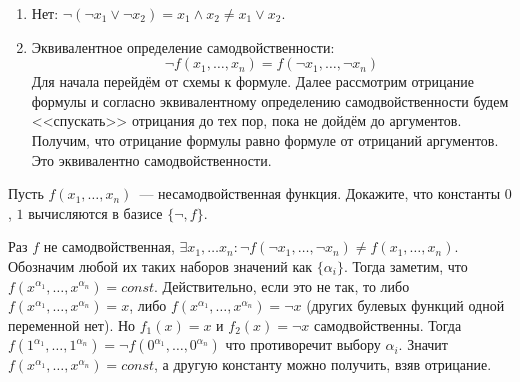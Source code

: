 \begin{Answer}
    \noindent
    \begin{enumerate}[label=\textbf{\alph*)}]
        \item
            Нет: $ \neg(\neg x_1 \vee \neg x_2) = x_1 \wedge x_2 \neq x_1 \vee x_2 $.
        \item
            Эквивалентное определение самодвойственности:
            \[
                \neg f(x_1, \ldots, x_n) = f(\neg x_1, \ldots, \neg x_n)
            \]
            Для начала перейдём от схемы к формуле.
            Далее рассмотрим отрицание формулы и согласно эквивалентному определению самодвойственности будем <<спускать>> отрицания до тех пор,
            пока не дойдём до аргументов.
            Получим, что отрицание формулы равно формуле от отрицаний аргументов.
            Это эквивалентно самодвойственности.
    \end{enumerate}
\end{Answer}


\begin{Exercise}[counter=SecExercise, label={exercise:boolean:not_self_dual}]
    \noindent
    Пусть $ f(x_1, \ldots, x_n) $~--- несамодвойственная функция.
    Докажите, что константы $ 0 $, $ 1 $ вычисляются в базисе $ \{\neg, f \} $.
\end{Exercise}

\begin{Answer}
    \noindent
    Раз $ f $ не самодвойственная,
    $ \exists x_1, \ldots x_n: \neg f(\neg x_1, \ldots, \neg x_n) \neq f(x_1, \ldots, x_n) $.
    Обозначим любой их таких наборов значений как $ \{ \alpha_i \} $.
    Тогда заметим, что $ f(x^{\alpha_1}, \ldots, x^{\alpha_n}) = const $.
    Действительно, если это не так, то либо $ f(x^{\alpha_1}, \ldots, x^{\alpha_n}) = x $,
    либо $ f(x^{\alpha_1}, \ldots, x^{\alpha_n}) = \neg x $
    (других булевых функций одной переменной нет).
    Но $ f_1(x) = x $ и $ f_2(x) = \neg x $ самодвойственны.
    Тогда $ f(1^{\alpha_1}, \ldots, 1^{\alpha_n}) = \neg f(0^{\alpha_1}, \ldots, 0^{\alpha_n}) $
    что противоречит выбору $ \alpha_i $.
    Значит $ f(x^{\alpha_1}, \ldots, x^{\alpha_n}) = const $,
    а другую константу можно получить, взяв отрицание.
\end{Answer}
